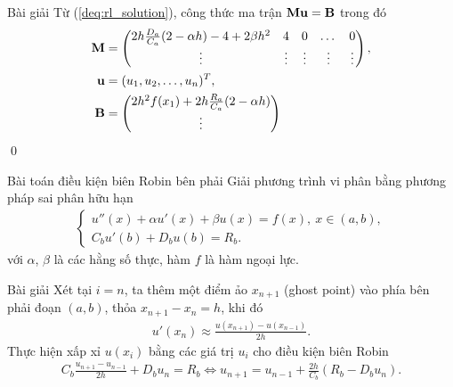 \documentclass[9pt]{beamer}
\numberwithin{equation}{section}
\begin{document}
\begin{frame}
\begin{exampleblock}{Bài giải}
    Từ (\ref{deq:rl_solution}), công thức ma trận ${\bf M} {\bf u} = {\bf B}$ trong đó
    \begin{align*}
        {\bf M} &= \begin{pmatrix}
            2h \frac{D_a}{C_a}(2 - \alpha h) - 4 + 2\beta h^2 & 4 & 0 & \dots & 0 \\
            \vdots & \vdots & \vdots & \vdots & \vdots
        \end{pmatrix}, \\
        {\bf u} &= (u_1, u_2, \ldots, u_n)^T, \\
        {\bf B} &= \begin{pmatrix}
            2h^2 f(x_1) + 2h \frac{R_a}{C_a}(2 - \alpha h) \\
            \vdots
        \end{pmatrix}
    \end{align*} \hfill \qed
\end{exampleblock}
\end{frame}

\begin{frame}
\begin{block}{Bài toán điều kiện biên Robin bên phải}
    Giải phương trình vi phân bằng phương pháp sai phân hữu hạn
    \begin{align*}
        \begin{cases}
        u''(x) + \alpha u'(x) + \beta u(x) = f(x), \ x \in (a,b), \\
        C_b u'(b) + D_b u(b) = R_b.
        \end{cases}
    \end{align*}
    với $\alpha$, $\beta$ là các hằng số thực, hàm $f$ là hàm ngoại lực.
\end{block}

\begin{exampleblock}{Bài giải}
    Xét tại $i = n$, ta thêm một điểm ảo $x_{n+1}$ (ghost point) vào phía bên phải đoạn $(a,b)$, thỏa $x_{n+1} - x_n = h$, khi đó
    \begin{align*}
        u'(x_n) \approx \frac{u(x_{n+1}) - u(x_{n-1})}{2h}.
    \end{align*}
    Thực hiện xấp xỉ $u(x_i)$ bằng các giá trị $u_i$ cho điều kiện biên Robin
    \begin{align*}
        C_b \frac{u_{n+1} - u_{n-1}}{2h} + D_b u_n = R_b
        \Leftrightarrow u_{n+1} = u_{n-1} + \frac{2h}{C_b}(R_b - D_b u_n).
    \end{align*}
\end{exampleblock}
\end{frame}
\end{document}
